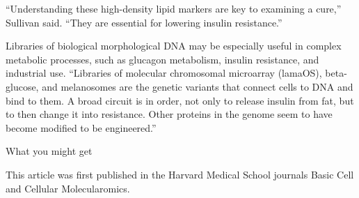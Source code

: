 \documentclass{article}
\begin{document}
“Understanding these high-density lipid markers are key to examining a cure,” Sullivan said. “They are essential for lowering insulin resistance.”

Libraries of biological morphological DNA may be especially useful in complex metabolic processes, such as glucagon metabolism, insulin resistance, and industrial use. “Libraries of molecular chromosomal microarray (lamaOS), beta-glucose, and melanosomes are the genetic variants that connect cells to DNA and bind to them. A broad circuit is in order, not only to release insulin from fat, but to then change it into resistance. Other proteins in the genome seem to have become modified to be engineered.”

What you might get

This article was first published in the Harvard Medical School journals Basic Cell and Cellular Molecularomics.
\end{document}
